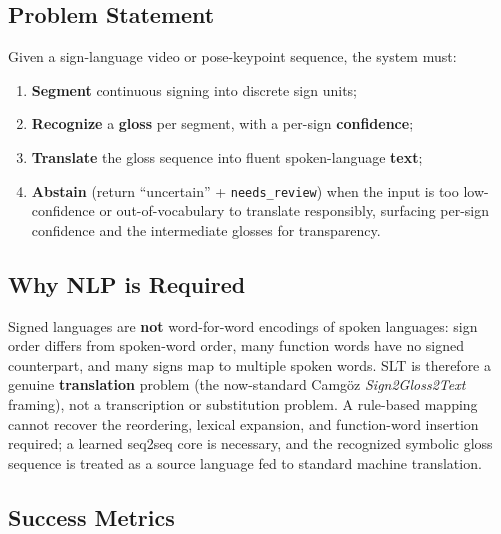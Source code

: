 \documentclass[12pt,a4paper]{article}
\begin{document}
\subsection{Problem Statement}

Given a sign-language video or pose-keypoint sequence, the system must:
\begin{enumerate}
  \item \textbf{Segment} continuous signing into discrete sign units;
  \item \textbf{Recognize} a \textbf{gloss} per segment, with a per-sign \textbf{confidence};
  \item \textbf{Translate} the gloss sequence into fluent spoken-language \textbf{text};
  \item \textbf{Abstain} (return ``uncertain'' + \texttt{needs\_review}) when the input is too low-confidence or out-of-vocabulary to translate responsibly, surfacing per-sign confidence and the intermediate glosses for transparency.
\end{enumerate}

\subsection{Why NLP is Required}

Signed languages are \textbf{not} word-for-word encodings of spoken languages: sign order differs from spoken-word order, many function words have no signed counterpart, and many signs map to multiple spoken words. SLT is therefore a genuine \textbf{translation} problem (the now-standard Camg\"oz \emph{Sign2Gloss2Text} framing), not a transcription or substitution problem. A rule-based mapping cannot recover the reordering, lexical expansion, and function-word insertion required; a learned seq2seq core is necessary, and the recognized symbolic gloss sequence is treated as a source language fed to standard machine translation.

\subsection{Success Metrics}
\end{document}
